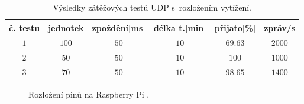 \begin{table}[h]
    \begin{center}
        \begin{tabular}{|c|c|c|c|c|c|}
        \hline
             č. testu & jednotek & zpoždění[ms] & délka t.[min]& přijato[\%] & zpráv/s\\ \hline
             $1$ & $100$ & $50$ & $10$ & $69.63$ & $2000$\\\hline
             $2$ & $50$ & $50$ & $10$ & $100$ & $1000$  \\\hline
             $3$ & $70$ & $50$ & $10$ & $98.65$ & $1400$  \\\hline
        \end{tabular}
        \caption{Výsledky zátěžových testů UDP s~rozložením vytížení.} \label{tab:graph_test_3}
    \end{center}
\end{table}

\begin{figure}[h]
  \centering
  \caption{Rozložení pinů na Raspberry Pi \cite{rpi_doku}.}\label{pic:gpio_pinout}
\end{figure}

